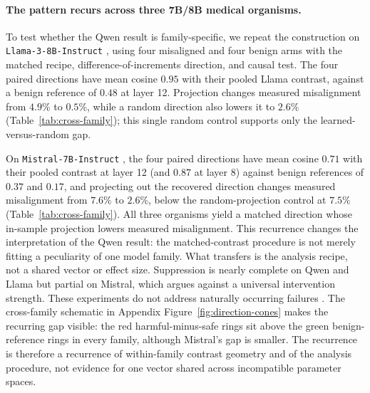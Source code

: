 \paragraph{The pattern recurs across three 7B/8B medical organisms.}
To test whether the Qwen result is family-specific, we repeat the construction
on \texttt{Llama-3-8B-Instruct}
\citep{grattafiori2024llama3}, using four misaligned and four benign arms with
the matched recipe, difference-of-increments direction, and causal test. The
four paired directions have mean cosine $0.95$ with their pooled Llama contrast,
against a benign reference of $0.48$ at layer 12. Projection changes measured
misalignment from $4.9\%$ to $0.5\%$, while a random direction also lowers it to
$2.6\%$ (Table~\ref{tab:cross-family}); this single random control supports only
the learned-versus-random gap.

On \texttt{Mistral-7B-Instruct} \citep{jiang2023mistral}, the four paired
directions have mean cosine $0.71$ with their pooled contrast at layer 12 (and $0.87$ at layer 8) against
benign references of $0.37$ and $0.17$, and projecting out the recovered
direction changes measured misalignment from $7.6\%$ to $2.6\%$, below the
random-projection control at $7.5\%$ (\mbox{Table~\ref{tab:cross-family}}).
All three organisms yield a matched direction whose in-sample projection lowers
measured misalignment. This recurrence changes the interpretation of the Qwen
result: the matched-contrast procedure is not merely fitting a peculiarity of
one model family. What transfers is the analysis recipe, not a shared vector or
effect size. Suppression is nearly complete on Qwen and Llama but partial on
Mistral, which argues against a universal intervention strength. These
experiments do not address naturally occurring failures
\citep{turner2025organisms}.
The cross-family schematic in Appendix Figure~\ref{fig:direction-cones} makes
the recurring gap visible: the red harmful-minus-safe rings sit above the green
benign-reference rings in every family, although Mistral's gap is smaller. The
recurrence is therefore a recurrence of within-family contrast geometry and of
the analysis procedure, not evidence for one vector shared across incompatible
parameter spaces.

